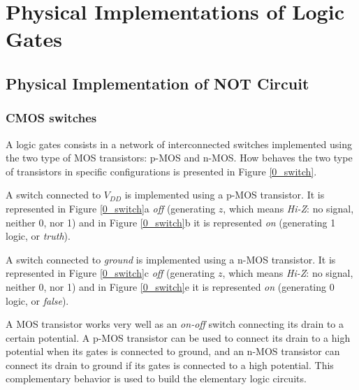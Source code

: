 \chapter{Physical Implementations of Logic Gates} \label{app:physical_implementations}


\section{Physical Implementation of NOT Circuit}

\subsection{CMOS switches}

A logic gates consists in a network of interconnected switches
implemented using the two type of MOS transistors: p-MOS and
n-MOS. How behaves the two type of transistors in specific
configurations is presented in Figure \ref{0_switch}.

A switch connected to $V_{DD}$ is implemented using a p-MOS
transistor. It is represented in Figure \ref{0_switch}a {\em off}
(generating $z$, which means {\em Hi-Z}: no signal, neither 0, nor
1) and in Figure \ref{0_switch}b it is represented {\em on}
(generating 1 logic, or {\em truth}).

A switch connected to {\em ground} is implemented using a n-MOS
transistor. It is represented in Figure \ref{0_switch}c {\em off}
(generating $z$, which means {\em Hi-Z}: no signal, neither 0, nor
1) and in Figure \ref{0_switch}e it is represented {\em on}
(generating 0 logic, or {\em false}).


A MOS transistor works very well as an {\em on-off} switch
connecting its drain to a certain potential.  A p-MOS transistor
can be used to connect its drain to a high potential when its
gates is connected to ground, and an n-MOS transistor can connect
its drain to ground if its gates is connected to a high potential.
This complementary behavior is used to build the elementary logic
circuits.


